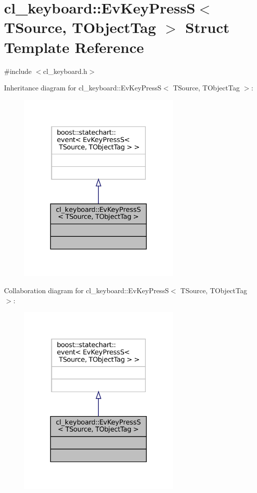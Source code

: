 \hypertarget{structcl__keyboard_1_1EvKeyPressS}{}\section{cl\+\_\+keyboard\+:\+:Ev\+Key\+PressS$<$ T\+Source, T\+Object\+Tag $>$ Struct Template Reference}
\label{structcl__keyboard_1_1EvKeyPressS}


{\ttfamily \#include $<$cl\+\_\+keyboard.\+h$>$}



Inheritance diagram for cl\+\_\+keyboard\+:\+:Ev\+Key\+PressS$<$ T\+Source, T\+Object\+Tag $>$\+:
\nopagebreak
\begin{figure}[H]
\begin{center}
\leavevmode
\includegraphics[width=224pt]{structcl__keyboard_1_1EvKeyPressS__inherit__graph}
\end{center}
\end{figure}


Collaboration diagram for cl\+\_\+keyboard\+:\+:Ev\+Key\+PressS$<$ T\+Source, T\+Object\+Tag $>$\+:
\nopagebreak
\begin{figure}[H]
\begin{center}
\leavevmode
\includegraphics[width=224pt]{structcl__keyboard_1_1EvKeyPressS__coll__graph}
\end{center}
\end{figure}


